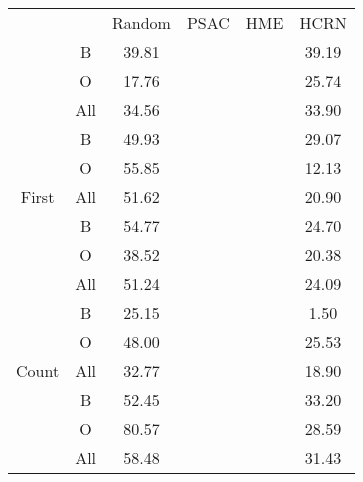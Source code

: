 \begin{tabular}{cccccc}
\multicolumn{1}{l}{}                             & \multicolumn{1}{l}{} & Random & PSAC & HME & HCRN  \\
\rowcolor[HTML]{F3F3F3} 
\cellcolor[HTML]{F3F3F3}                         & B                    & 39.81  &      &     & 39.19 \\
\rowcolor[HTML]{F3F3F3} 
\cellcolor[HTML]{F3F3F3}                         & O                    & 17.76  &      &     & 25.74 \\
\rowcolor[HTML]{F3F3F3} 
\multirow{-3}{*}{\cellcolor[HTML]{F3F3F3}Before} & All                  & 34.56  &      &     & 33.90 \\
                                                 & B                    & 49.93  &      &     & 29.07 \\
                                                 & O                    & 55.85  &      &     & 12.13 \\
\multirow{-3}{*}{First}                          & All                  & 51.62  &      &     & 20.90 \\
\rowcolor[HTML]{F3F3F3} 
\cellcolor[HTML]{F3F3F3}                         & B                    & 54.77  &      &     & 24.70 \\
\rowcolor[HTML]{F3F3F3} 
\cellcolor[HTML]{F3F3F3}                         & O                    & 38.52  &      &     & 20.38 \\
\rowcolor[HTML]{F3F3F3} 
\multirow{-3}{*}{\cellcolor[HTML]{F3F3F3}Longer} & All                  & 51.24  &      &     & 24.09 \\
                                                 & B                    & 25.15  &      &     & 1.50  \\
                                                 & O                    & 48.00  &      &     & 25.53 \\
\multirow{-3}{*}{Count}                          & All                  & 32.77  &      &     & 18.90 \\
\rowcolor[HTML]{F3F3F3} 
\cellcolor[HTML]{F3F3F3}                         & B                    & 52.45  &      &     & 33.20 \\
\rowcolor[HTML]{F3F3F3} 
\cellcolor[HTML]{F3F3F3}                         & O                    & 80.57  &      &     & 28.59 \\
\rowcolor[HTML]{F3F3F3} 
\multirow{-3}{*}{\cellcolor[HTML]{F3F3F3}ObjRel} & All                  & 58.48  &      &     & 31.43
\end{tabular}